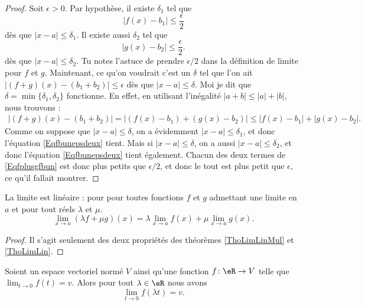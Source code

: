 \begin{proof}
	Soit $\epsilon>0$. Par hypothèse, il existe $\delta_1$ tel que
	\begin{equation}    \label{Eqfbunepsdeux}
		| f(x)-b_1 |\leq \frac{ \epsilon }{ 2 }
	\end{equation}
	dès que $| x-a |\leq\delta_1$. Il existe aussi $\delta_2$ tel que
	\begin{equation}    \label{Eqgbdeuxepsdeux}
		| g(x)-b_2 |\leq \frac{ \epsilon }{ 2 }.
	\end{equation}
	dès que $| x-a |\leq \delta_2$. Tu notes l'astuce de prendre $\epsilon/2$ dans la définition de limite pour $f$ et $g$. Maintenant, ce qu'on voudrait c'est un $\delta$ tel que l'on ait $| (f+g)(x)-(b_1+b_2) |\leq \epsilon$ dès que $| x-a |\leq \delta$. Moi je dit que $\delta=\min\{ \delta_1,\delta_2 \}$ fonctionne. En effet, en utilisant l'inégalité $| a+b |\leq | a |+| b |$, nous trouvons :
	\begin{align}
		| (f+g)(x)-(b_1+b_2) |=| (f(x)-b_1)+(g(x)-b_2) |
		\leq | f(x)-b_1 |+| g(x)-b_2 |.     \label{Eqfplusgfbun}
	\end{align}
	Comme on suppose que $| x-a |\leq\delta$, on a évidemment $| x-a |\leq\delta_1$, et donc l'équation \eqref{Eqfbunepsdeux} tient. Mais si $| x-a |\leq\delta$, on a aussi $| x-a |\leq\delta_2$, et donc l'équation  \eqref{Eqfbunepsdeux} tient également. Chacun des deux termes de \eqref{Eqfplusgfbun} est donc plus petits que $\epsilon/2$, et donc le tout est plus petit que $\epsilon$, ce qu'il fallait montrer.
\end{proof}

\begin{proposition}     \label{PROPooVLBWooVttvFK}
	La limite est linéaire : pour pour toutes fonctions $f$ et $g$ admettant une limite en $a$ et pour tout réels $\lambda$ et $\mu$.
	\begin{equation}
		\lim_{x\to a} (\lambda f+\mu g)(x)=\lambda\lim_{x\to a} f(x)+\mu\lim_{x\to a} g(x).
	\end{equation}
\end{proposition}

\begin{proof}
	Il s'agit seulement des deux propriétés des théorèmes \ref{ThoLimLinMul} et \ref{ThoLimLin}.
\end{proof}

\begin{lemma}       \label{LEMooYJGLooVBaglB}
	Soient un espace vectoriel normé \( V\) ainsi qu'une fonction \( f\colon \eR\to V\) telle que \( \lim_{t\to 0} f(t)=v\). Alors pour tout \( \lambda\in \eR\) nous avons
	\begin{equation}
		\lim_{t\to 0} f(\lambda t)=v.
	\end{equation}
\end{lemma}

